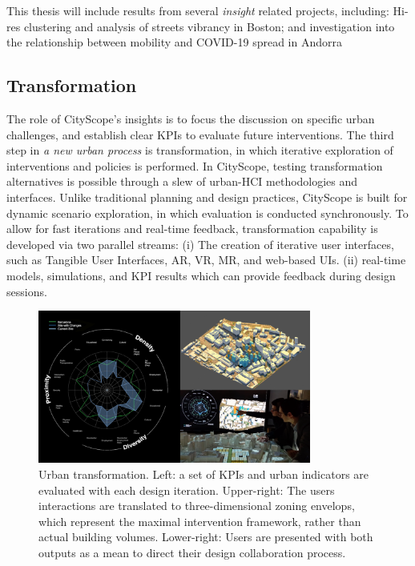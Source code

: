 {This thesis will include results from several \textit{insight} related projects, including: Hi-res clustering and analysis of streets vibrancy in Boston; and investigation into the relationship between mobility and COVID-19 spread in Andorra}


\subsection{Transformation}

{The role of CityScope's insights is to focus the discussion on specific urban challenges, and establish clear KPIs to evaluate future interventions. The third step in \textit{a new urban process} is transformation, in which iterative exploration of interventions and policies is performed. In CityScope, testing transformation alternatives is possible through a slew of urban-HCI methodologies and interfaces. Unlike traditional planning and design practices, CityScope is built for dynamic scenario exploration, in which evaluation is conducted synchronously. To allow for fast iterations and real-time feedback, transformation capability is developed via two parallel streams: (i) The creation of iterative user interfaces, such as Tangible User Interfaces, AR, VR, MR, and web-based UIs. (ii) real-time models, simulations, and KPI results which can provide feedback during design sessions.}

\begin{figure}[t]
\begin{center}
    \includegraphics[width=0.8\textwidth]{figures/volpe_ui.png}
\end{center}
   \caption{Urban transformation. Left: a set of KPIs and urban indicators are evaluated with each design iteration. Upper-right: The users interactions are translated to three-dimensional zoning envelops, which represent the maximal intervention framework, rather than actual building volumes. Lower-right: Users are presented with both outputs as a mean to direct their design collaboration process.}
\label{fig:volpe_ui}
\end{figure}


